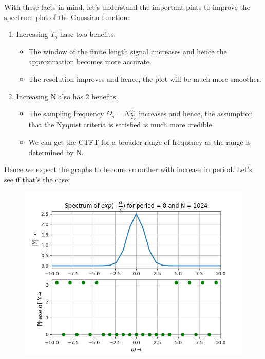 \documentclass[12pt, a4paper]{article}
\begin{document}
With these facts in mind, let's understand the important pints to improve the spectrum plot of the Gaussian function:
\begin{enumerate}
    \item Increasing $T_{o}$ hase two benefits: 
    \begin{itemize}
        \item The window of the finite length signal iincreases and hence the approximation becomes more accurate. 
        \item The resolution improves and hence, the plot will be much more smoother.
    \end{itemize}
    \item Increasing N also has 2 benefits:
    \begin{itemize}
        \item The sampling frequency $\Omega_{s} = N\frac{2\pi}{T_{o}}$ increases and hence, the assumption that the Nyquist criteria is satisfied is much more credible
        \item We can get the CTFT for a broader range of frequency as the range is determined by N.
    \end{itemize}
\end{enumerate}

Hence we expect the graphs to become smoother with increase in period. Let's see if that's the case:

\begin{figure}[H]
    \centering
    \includegraphics[scale = 0.8]{Figure_11.png}
    \label{fig:sample}
\end{figure}
\end{document}
